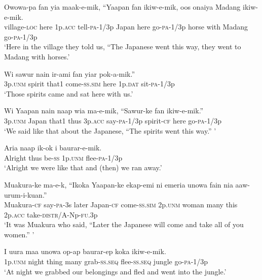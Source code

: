 \ea\label{ex:a:x11}
\gll  Owowa-pa  fan  yia  maak-e-mik,  “Yaapan  fan  ikiw-e-mik,       oos  onaiya  Madang  ikiw-e-mik. \\
village-\textsc{loc}  here  1p.\textsc{acc}  tell-\textsc{pa}-1/3p  Japan  here  go-\textsc{pa}-1/3p horse  with  Madang  go-\textsc{pa}-1/3p \\
\glt ‘Here in the village they told us, “The Japanese went this way, they went to Madang with horses.’ \\
\z


\ea\label{ex:a:x12}
\gll  Wi  sawur  nain  ir-ami  fan  yiar  pok-a-mik.” \\
3p.\textsc{unm}  spirit{{\footnotemark}} that1  come-\textsc{ss}.\textsc{sim}  here  1p.\textsc{dat}  sit-\textsc{pa}-1/3p \\
\glt ‘Those spirits came and sat here with us.’ \\
\z
{} 

\ea\label{ex:a:x13}
\gll  Wi  Yaapan  nain  naap  wia  ma-e-mik,  “Sawur-ke       fan  ikiw-e-mik.” \\
3p.\textsc{unm}  Japan  that1  thus  3p.\textsc{acc}  say-\textsc{pa}-1/3p  spirit-\textsc{cf} here  go-\textsc{pa}-1/3p \\
\glt ‘We said like that about the Japanese, “The spirits went this way.” ’ \\
\z


\ea\label{ex:a:x14}
\gll  Aria  naap  ik-ok  i  baurar-e-mik. \\
Alright  thus  be-\textsc{ss}  1p.\textsc{unm}  flee-\textsc{pa}-1/3p \\
\glt ‘Alright we were like that and (then) we ran away.’ \\
\z


\ea\label{ex:a:x15}
\gll  Muakura-ke  ma-e-k,  ``Ikoka  Yaapan-ke  ekap-emi  ni       emeria  unowa  fain  nia  aaw-urum-i-kuan.” \\
Muakura-\textsc{cf}  say-\textsc{pa}-3s  later  Japan-\textsc{cf}  come-\textsc{ss}.\textsc{sim}  2p.\textsc{unm} woman  many  this  2p.\textsc{acc}  take-\textsc{distr}/A-Np-\textsc{fu}.3p \\
\glt ‘It was Muakura who said, “Later the Japanese will come and take all of you women.” ’ \\
\z


\ea\label{ex:a:x16}
\gll  I  uura  maa  unowa  op-ap  baurar-ep  koka       ikiw-e-mik. \\
1p.\textsc{unm}  night  thing  many  grab-\textsc{ss.seq}  flee-\textsc{ss.seq}  jungle go-\textsc{pa}-1/3p \\
\glt ‘At night we grabbed our belongings and fled and went into the jungle.’ \\
\z


